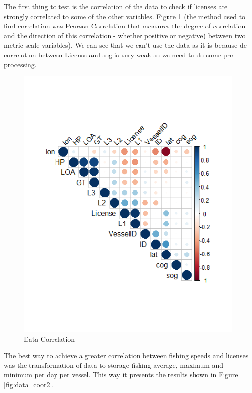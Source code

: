 The first thing to test is the correlation of the data to check if licenses are strongly correlated to some of the other variables. Figure \ref{fig:data_coor1} (the method used to find correlation was Pearson Correlation \cite{Benesty2009} that measures the degree of correlation and the direction of this correlation - whether positive or negative) between two metric scale variables). We can see that we can’t use the data as it is because de correlation between License and sog is very weak so we need to do some pre-processing.
\begin{figure}[h]
    \centering
    \includegraphics[width=0.7\linewidth]{Chapters/img/data_coor1.png}
    \caption{Data Correlation}
    \label{fig:data_coor1}
\end{figure}




The best way to achieve a greater correlation between fishing speeds and licenses was the transformation of data to storage fishing average, maximum and minimum per day per vessel. This way it presents the results shown in Figure \ref{fig:data_coor2}.

